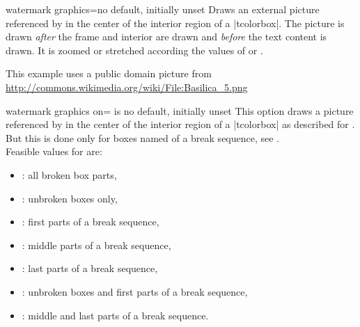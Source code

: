 

\begin{docTcbKey}{watermark graphics}{=}{no default, initially unset}
Draws an external picture referenced by 
in the center of the interior region of a |tcolorbox|.
The picture is drawn \emph{after} the
frame and interior are drawn and \emph{before} the text content is drawn.
It is zoomed or stretched according the values of
 or .
\begin{dispExample}

\begin{tcolorbox}[enhanced,title=My title,watermark graphics=Basilica_5.png,
watermark opacity=0.15]
\lipsum[1-2]
\tcblower
This example uses a public domain picture from\\
\url{http://commons.wikimedia.org/wiki/File:Basilica_5.png}
\end{tcolorbox}
\end{dispExample}
\end{docTcbKey}


\begin{docTcbKey}{watermark graphics on}{= is }{no default, initially unset}
This option draws a picture referenced by  in the center of the interior region of a |tcolorbox|
as described for .
But this is done only for boxes named  of a break sequence, see
.\\ 
Feasible values for  are:
\begin{itemize}
\item{}: all broken box parts,
\item{}: unbroken boxes only,
\item{}: first parts of a break sequence,
\item{}: middle parts of a break sequence,
\item{}: last parts of a break sequence,
\item{}: unbroken boxes and first parts of a break sequence,
\item{}: middle and last parts of a break sequence.
\end{itemize}
\end{docTcbKey}



